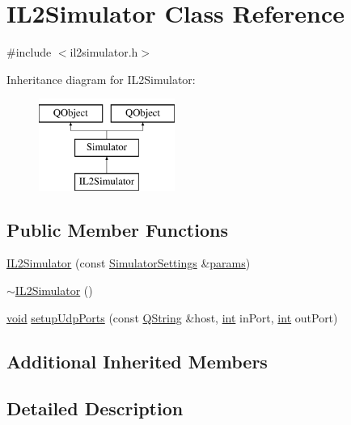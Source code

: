 \hypertarget{class_i_l2_simulator}{\section{I\-L2\-Simulator Class Reference}
\label{class_i_l2_simulator}
}


{\ttfamily \#include $<$il2simulator.\-h$>$}

Inheritance diagram for I\-L2\-Simulator\-:\begin{figure}[H]
\begin{center}
\leavevmode
\includegraphics[height=3.000000cm]{class_i_l2_simulator}
\end{center}
\end{figure}
\subsection*{Public Member Functions}
\begin{DoxyCompactItemize}
\item 
\hyperlink{group__hitlplugin_gae9b990b18a524ff0201db3bbd5608950}{I\-L2\-Simulator} (const \hyperlink{group___h_i_t_l_plugin_ga052199f1328d3002bce3e45345aa7f4e}{Simulator\-Settings} \&\hyperlink{glext_8h_afeb6390ab3bc8a0e96a88aff34d52288}{params})
\item 
\hyperlink{group__hitlplugin_gaa5f298fa31201781813a733316fc02e4}{$\sim$\-I\-L2\-Simulator} ()
\item 
\hyperlink{group___u_a_v_objects_plugin_ga444cf2ff3f0ecbe028adce838d373f5c}{void} \hyperlink{group__hitlplugin_ga26c1964cdb6c16877509250d1ba197c7}{setup\-Udp\-Ports} (const \hyperlink{group___u_a_v_objects_plugin_gab9d252f49c333c94a72f97ce3105a32d}{Q\-String} \&host, \hyperlink{ioapi_8h_a787fa3cf048117ba7123753c1e74fcd6}{int} in\-Port, \hyperlink{ioapi_8h_a787fa3cf048117ba7123753c1e74fcd6}{int} out\-Port)
\end{DoxyCompactItemize}
\subsection*{Additional Inherited Members}


\subsection{Detailed Description}


